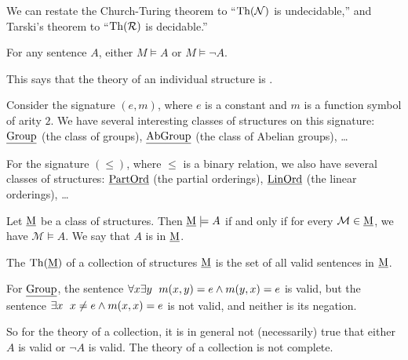 \begin{remark}
  We can restate the Church-Turing theorem to \enquote{$\operatorname{Th}(\mathcal{N})$ is
	undecidable,} and Tarski's theorem to \enquote{$\operatorname{Th}(\mathcal{R})$ is
	decidable.}
\end{remark}

\begin{proposition}
  For any sentence $A$, either $M \models A$ or $M \models \lnot A$.
\end{proposition}

\begin{remark}
  This says that the theory of an individual structure is .
\end{remark}

\begin{example}
  Consider the signature $(e, m)$, where $e$ is a constant and $m$ is a function
  symbol of arity $2$.
  We have several interesting classes of structures on this signature:
  $\underline{\text{Group}}$ (the class of groups), $\underline{\text{AbGroup}}$ (the class of Abelian
  groups), \ldots
\end{example}

\begin{example}
  For the signature $(\le)$, where $\le$ is a binary relation, we also have
  several classes of structures: $\underline{\text{PartOrd}}$ (the partial orderings),
  $\underline{\text{LinOrd}}$ (the linear orderings), \ldots
\end{example}

\begin{definition}
  Let $\underline{\text{M}}$ be a class of structures.
  Then $\underline{\text{M}} \models A$ if and only if for every $\mathcal{M} \in \underline{\text{M}}$,
  we have $\mathcal{M} \models A$.
  We say that $A$ is  in $\underline{\text{M}}$.
\end{definition}

\begin{definition}
  The  $\operatorname{Th}(\underline{\text{M}})$ of a collection of structures $\underline{\text{M}}$ is
  the set of all valid sentences in $\underline{\text{M}}$.
\end{definition}

\begin{example}
  For $\underline{\text{Group}}$, the sentence $\forall x \exists y \;\  m(x,y) = e \land
  m(y,x) = e$ is valid, but the sentence $\exists x \;\  x \ne e \land m(x,x)
  = e$ is not valid, and neither is its negation.
\end{example}

So for the theory of a collection, it is in general not (necessarily) true that
either $A$ is valid or $\lnot A$ is valid.
The theory of a collection is not complete.

